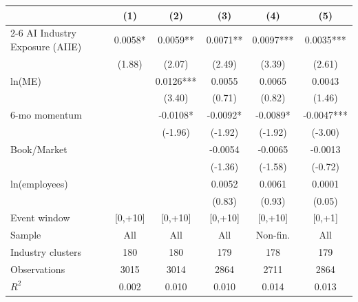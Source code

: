 \begin{tabular}{lccccc}
\toprule
& \multicolumn{1}{c}{(1)} & \multicolumn{1}{c}{(2)} & \multicolumn{1}{c}{(3)} & \multicolumn{1}{c}{(4)} & \multicolumn{1}{c}{(5)} \\
\cmidrule(lr){2-6}
AI Industry Exposure (AIIE) & 0.0058* & 0.0059** & 0.0071** & 0.0097*** & 0.0035*** \\
 & (1.88) & (2.07) & (2.49) & (3.39) & (2.61) \\[3pt]
ln(ME) &  & 0.0126*** & 0.0055 & 0.0065 & 0.0043 \\
 &  & (3.40) & (0.71) & (0.82) & (1.46) \\[3pt]
6-mo momentum &  & -0.0108* & -0.0092* & -0.0089* & -0.0047*** \\
 &  & (-1.96) & (-1.92) & (-1.92) & (-3.00) \\[3pt]
Book/Market &  &  & -0.0054 & -0.0065 & -0.0013 \\
 &  &  & (-1.36) & (-1.58) & (-0.72) \\[3pt]
ln(employees) &  &  & 0.0052 & 0.0061 & 0.0001 \\
 &  &  & (0.83) & (0.93) & (0.05) \\[3pt]
\midrule
Event window & [0,+10] & [0,+10] & [0,+10] & [0,+10] & [0,+1] \\
Sample & All & All & All & Non-fin. & All \\
Industry clusters & 180 & 180 & 179 & 178 & 179 \\
Observations & 3015 & 3014 & 2864 & 2711 & 2864 \\
$R^2$ & 0.002 & 0.010 & 0.010 & 0.014 & 0.013 \\
\bottomrule
\end{tabular}